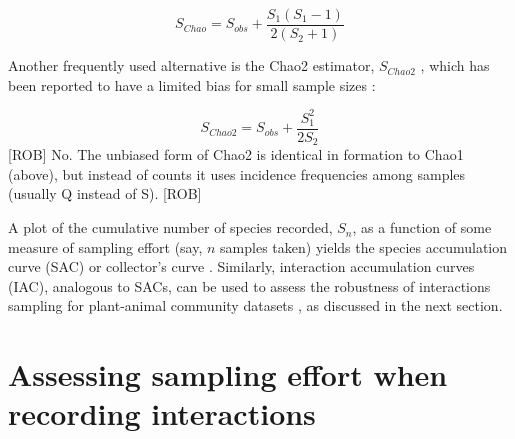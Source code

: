 \documentclass[12pt]{article}
\begin{document}
$$S_{Chao}= S_{obs} + \frac{S_1 (S_1-1)}{2(S_2+1)}$$ 

Another frequently used alternative is the Chao2 estimator, $S_{Chao2}$ \citep{Gotelli:2001uo}, which has been reported to have a limited bias for small sample sizes \citep{Colwell:1994vt,Chao:2005wp}: 

$$S_{Chao2}= S_{obs} + \frac{S_1^2}{2S_2}$$ 
[ROB]
No. The unbiased form of Chao2 is identical in formation to Chao1 (above), but instead of counts it uses incidence frequencies among samples (usually Q instead of S).
[ROB]

A plot of the cumulative number of species recorded, $S_n$, as a function of some measure of sampling effort (say, $n$ samples taken) yields the species accumulation curve (SAC) or collector's curve \citep{Colwell:1994vt}. Similarly, interaction accumulation curves (IAC), analogous to SACs, can be used to assess the robustness of interactions sampling for plant-animal community datasets \citep{E31/2562,Jordano:2009c,Olesen:2011a}, as discussed in the next section.  

\section*{Assessing sampling effort when recording interactions}
\label{assessingsamplingeffortwhenrecordinginteractions}
\end{document}
